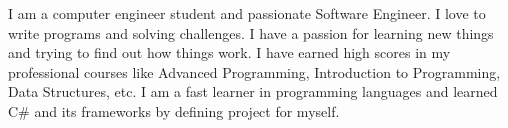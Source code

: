 

\begin{cvparagraph}
I am a computer engineer student and passionate Software Engineer. I love to write programs and solving challenges. I have a passion for learning new things and trying to find out how things work. I have earned high scores in my professional courses like Advanced Programming, Introduction to Programming, Data Structures, etc. I am a fast learner in programming languages and learned C\# and its frameworks by defining project for myself.
    
\end{cvparagraph}

